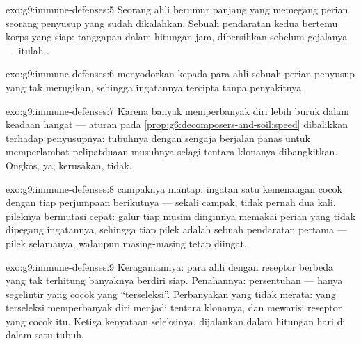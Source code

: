 \begin{solution}{exo:g9:immune-defenses:5}
Seorang ahli berumur panjang yang memegang perian seorang
penyusup yang sudah dikalahkan. Sebuah pendaratan kedua
bertemu korps yang siap: tanggapan dalam hitungan jam,
dibersihkan sebelum gejalanya --- itulah .
\end{solution}

\begin{solution}{exo:g9:immune-defenses:6}
 menyodorkan kepada para ahli  sebuah
perian penyusup yang tak merugikan, sehingga ingatannya
tercipta tanpa penyakitnya.
\end{solution}

\begin{solution}{exo:g9:immune-defenses:7}
Karena banyak  memperbanyak diri lebih buruk dalam
keadaan hangat --- aturan  pada
\cref{prop:g6:decomposers-and-soil:speed} dibalikkan
terhadap penyusupnya: tubuhnya dengan sengaja berjalan panas
untuk memperlambat pelipatduaan musuhnya selagi tentara
klonanya dibangkitkan. Ongkos, ya; kerusakan, tidak.
\end{solution}

\begin{solution}{exo:g9:immune-defenses:8}
 campaknya mantap: ingatan satu kemenangan cocok
dengan tiap perjumpaan berikutnya --- sekali campak, tidak
pernah dua kali.  pileknya bermutasi cepat: galur tiap
musim dinginnya memakai perian yang tidak dipegang
ingatannya, sehingga tiap pilek adalah sebuah pendaratan
pertama --- pilek selamanya, walaupun masing-masing tetap
diingat.
\end{solution}

\begin{solution}{exo:g9:immune-defenses:9}
Keragamannya: para ahli dengan reseptor berbeda yang tak
terhitung banyaknya berdiri siap. Penahannya: persentuhan
 --- hanya segelintir yang cocok yang
``terseleksi''. Perbanyakan yang tidak merata: yang
terseleksi memperbanyak diri menjadi tentara klonanya, dan
mewarisi reseptor yang cocok itu. Ketiga kenyataan
seleksinya, dijalankan dalam hitungan hari di dalam satu tubuh.
\end{solution}

